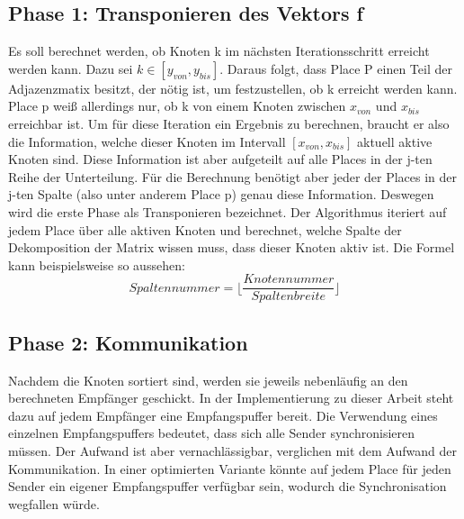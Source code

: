 \subsection{Phase 1: Transponieren des Vektors f} %
\label{sub:transponieren_des_vektors_f}
Es soll berechnet werden, ob Knoten k im nächsten Iterationsschritt erreicht werden kann. Dazu sei $k \in \left[y_{von}, y_{bis} \right]$. Daraus folgt, dass Place P einen Teil der Adjazenzmatix besitzt, der nötig ist, um festzustellen, ob k erreicht werden kann. Place p weiß allerdings nur, ob k von einem Knoten zwischen $x_{von}$ und $x_{bis}$ erreichbar ist. Um für diese Iteration ein Ergebnis zu berechnen, braucht er also die Information, welche dieser Knoten im Intervall $\left[x_{von}, x_{bis} \right]$ aktuell aktive Knoten sind. Diese Information ist aber aufgeteilt auf alle Places in der j-ten Reihe der Unterteilung. Für die Berechnung benötigt aber jeder der Places in der j-ten Spalte (also unter anderem Place p) genau diese Information. Deswegen wird die erste Phase als Transponieren bezeichnet. Der Algorithmus iteriert auf jedem Place über alle aktiven Knoten und berechnet, welche Spalte der Dekomposition der Matrix wissen muss, dass dieser Knoten aktiv ist. Die Formel kann beispielsweise so aussehen: $$\mathit{Spaltennummer}= \lfloor\frac{\mathit{Knotennummer}}{\mathit{Spaltenbreite}}\rfloor$$

\subsection{Phase 2: Kommunikation} %
\label{ssub:kommunikation}
Nachdem die Knoten sortiert sind, werden sie jeweils nebenläufig an den berechneten Empfänger geschickt. In der Implementierung zu dieser Arbeit steht dazu auf jedem Empfänger eine Empfangspuffer bereit. Die Verwendung eines einzelnen Empfangspuffers bedeutet, dass sich alle Sender synchronisieren müssen. Der Aufwand ist aber vernachlässigbar, verglichen mit dem Aufwand der Kommunikation. In einer optimierten Variante könnte auf jedem Place für jeden Sender ein eigener Empfangspuffer verfügbar sein, wodurch die Synchronisation wegfallen würde.

